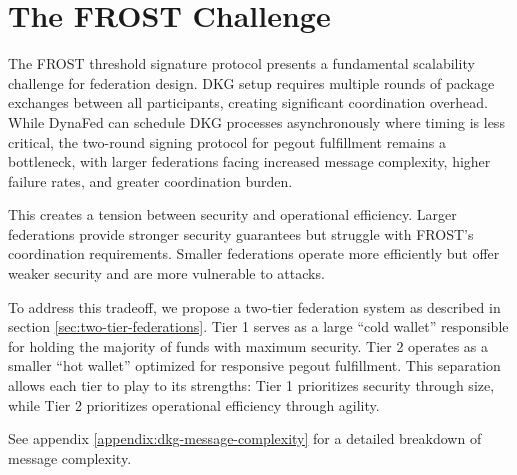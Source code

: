 \section{The FROST Challenge}
\label{sec:frost-challenge}

The FROST threshold signature protocol presents a fundamental scalability challenge for federation design. DKG setup requires multiple rounds of package exchanges between all participants, creating significant coordination overhead. While DynaFed can schedule DKG processes asynchronously where timing is less critical, the two-round signing protocol for pegout fulfillment remains a bottleneck, with larger federations facing increased message complexity, higher failure rates, and greater coordination burden.

This creates a tension between security and operational efficiency. Larger federations provide stronger security guarantees but struggle with FROST's coordination requirements. Smaller federations operate more efficiently but offer weaker security and are more vulnerable to attacks.

To address this tradeoff, we propose a two-tier federation system as described in section \ref{sec:two-tier-federations}. Tier 1 serves as a large ``cold wallet'' responsible for holding the majority of funds with maximum security. Tier 2 operates as a smaller ``hot wallet'' optimized for responsive pegout fulfillment. This separation allows each tier to play to its strengths: Tier 1 prioritizes security through size, while Tier 2 prioritizes operational efficiency through agility.

See appendix \ref{appendix:dkg-message-complexity} for a detailed breakdown of message complexity.
